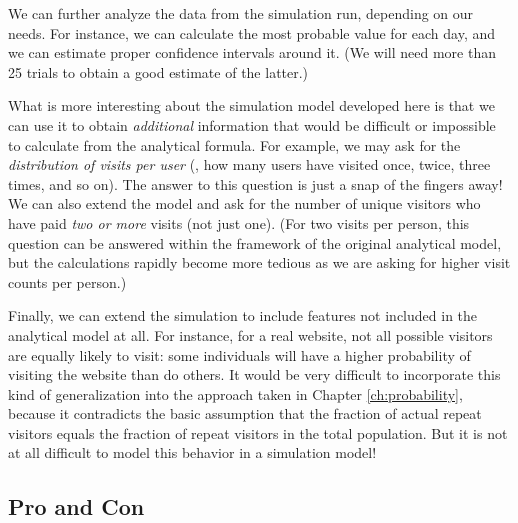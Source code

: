 We can further analyze the data from the simulation run, depending on
our needs. For instance, we can calculate the most probable value for
each day, and we can estimate proper confidence intervals around it.
(We will need more than 25 trials to obtain a good estimate of the
latter.)

What is more interesting about the simulation model developed here is
that we can use it to obtain \emph{additional} information that would
be difficult or impossible to calculate from the analytical formula.
For example, we may ask for the \emph{distribution of visits per user}
(\ie, how many users have visited once, twice, three times, and so
on). The answer to this question is just a snap of the fingers away!
We can also extend the model and ask for the number of unique visitors
who have paid \emph{two or more} visits (not just one). (For two
visits per person, this question can be answered within the framework
of the original analytical model, but the calculations rapidly become
more tedious as we are asking for higher visit counts per person.)

Finally, we can extend the simulation to include features not included
in the analytical model at all. For instance, for a real website, not
all possible visitors are equally likely to visit: some individuals
will have a higher probability of visiting the website than do others.
It would be very difficult to incorporate this kind of generalization
into the approach taken in Chapter \ref{ch:probability}, because it
contradicts the basic assumption that the fraction of actual repeat
visitors equals the fraction of repeat visitors in the total
population. But it is not at all difficult to model this behavior in a
simulation model!


% 

\subsection{Pro and Con}

 
